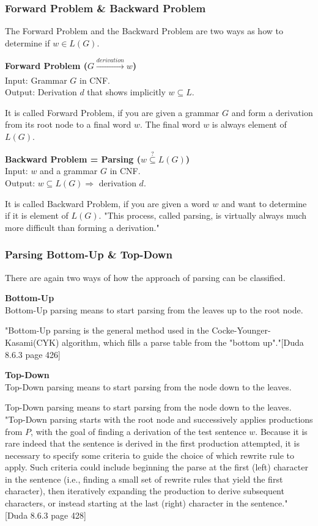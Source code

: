 \subsubsection{Forward Problem \& Backward Problem}
The Forward Problem and the Backward Problem are two ways as how to determine if $w \in L(G)$.	
\begin{DefGrey}
	\textbf{Forward Problem ($G \xrightarrow[]{derivation} w$)} \\
	Input: Grammar $G$ in CNF. \\
	Output: Derivation $d$ that shows implicitly $w \subseteq L$.
\end{DefGrey}
\noindent It is called Forward Problem, if you are given a grammar $G$ and form a derivation from its root node to a final word $w$. The final word $w$ is always element of $L(G)$.
\begin{DefGrey}
	\textbf{Backward Problem = Parsing ($w\overset{?}{\subseteq}L(G)$)}\\
	Input: $w$ and a grammar $G$ in CNF. \\
	Output: $w \subseteq L(G) \Longrightarrow$ derivation $d$.
\end{DefGrey}
\noindent It is called Backward Problem, if you are given a word $w$ and want to determine if it is element of $L(G)$. "This process, called parsing, is virtually always much more difficult than forming a derivation."
\subsubsection{Parsing Bottom-Up \& Top-Down}
There are again two ways of how the approach of parsing can be classified.
\begin{DefGrey}
	\textbf{Bottom-Up} \\
	 Bottom-Up parsing means to start parsing from the leaves up to the root node.
\end{DefGrey}
\noindent "Bottom-Up parsing is the general method used in the Cocke-Younger-Kasami(CYK) algorithm, which fills a parse table from the "bottom up"."[Duda 8.6.3 page 426]
\begin{DefGrey}
	\textbf{Top-Down} \\
	 Top-Down parsing means to start parsing from the node down to the leaves.
\end{DefGrey}
\noindent Top-Down parsing means to start parsing from the node down to the leaves. "Top-Down parsing starts with the root node and successively applies productions from $P$, with the goal of finding a derivation of the test sentence $w$. Because it is rare indeed that the sentence is derived in the first production attempted, it is necessary to specify some criteria to guide the choice of which rewrite rule to apply. Such criteria could include beginning the parse at the first (left) character in the sentence (i.e., finding a small set of rewrite rules that yield the first character), then iteratively expanding the production to derive subsequent characters, or instead starting at the last (right) character in the sentence." [Duda 8.6.3 page 428]\\

